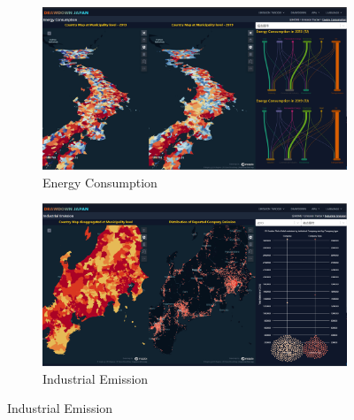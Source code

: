 \begin{figure}[tbh!]
  \begin{subfigure}{.5\textwidth}
      \centering
      \includegraphics[width=.9\textwidth]{figs/chap7/ems_consumption.png}
      \caption{Energy Consumption}
      \label{fig:chap7_fig_ems_tracker_b}
  \end{subfigure}%
  \begin{subfigure}{.5\textwidth}
      \centering
      \includegraphics[width=.9\textwidth]{figs/chap7/industrial_ems.png}
      \caption{Industrial Emission}
      \label{fig:chap7_fig_ems_tracker_c}
  \end{subfigure}


\end{figure}
